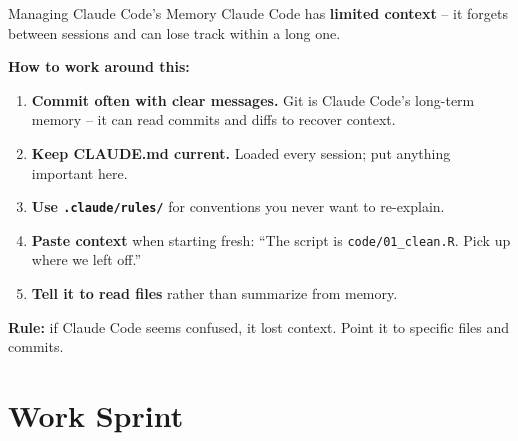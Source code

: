 \begin{frame}{Managing Claude Code's Memory}
  \small
  Claude Code has \textbf{limited context} -- it forgets between sessions and can lose track within a long one.

  \vspace{3pt}

  \textbf{How to work around this:}
  \begin{enumerate}\setlength{\itemsep}{1pt}
    \item \textbf{Commit often with clear messages.} Git is Claude Code's long-term memory -- it can read commits and diffs to recover context.
    \item \textbf{Keep CLAUDE.md current.} Loaded every session; put anything important here.
    \item \textbf{Use \texttt{.claude/rules/}} for conventions you never want to re-explain.
    \item \textbf{Paste context} when starting fresh: ``The script is \texttt{code/01\_clean.R}. Pick up where we left off.''
    \item \textbf{Tell it to read files} rather than summarize from memory.
  \end{enumerate}

  \vspace{2pt}

  \textbf{\textcolor{usfgreen}{Rule:}} if Claude Code seems confused, it lost context. Point it to specific files and commits.
\end{frame}


\section{Work Sprint}

